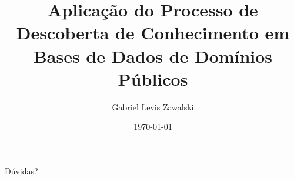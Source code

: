 \documentclass{beamer}
\title[Defesa de Proposta de TCC]{Aplicação do Processo de Descoberta de Conhecimento em Bases de Dados de Domínios Públicos} %
\author[Gabriel]{
Gabriel Levis Zawalski\\
} %
\institute[UTFPR] %
{
Universidade Tecnológica Federal do Paraná\\ %
\medskip
\textit{gabrielzawalski@gmail.com} \\ %
\medskip
\url{https://github.com/glzawalski/} 
}
\date{\today} %
\begin{document}
\begin{frame}
\titlepage %
\end{frame}











\section*{}
\begin{frame}
\centerline{Dúvidas?}
\titlepage
\end{frame}

\end{document}

